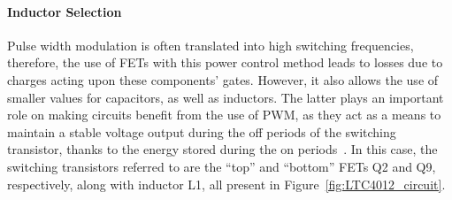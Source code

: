 \paragraph{Inductor Selection}	Pulse width modulation is often translated into high switching frequencies, therefore, the use of FETs with this power control method leads to losses due to charges acting upon these components' gates. However, it also allows the use of smaller values for capacitors, as well as inductors. The latter plays an important role on making circuits benefit from the use of PWM, as they act as a means to maintain a stable voltage output during the off periods of the switching transistor, thanks to the energy stored during the on periods~\cite{pwm_site}. In this case, the switching transistors referred to are the ``top'' and ``bottom'' FETs Q2 and Q9, respectively, along with inductor L1, all present in Figure~\ref{fig:LTC4012_circuit}.

